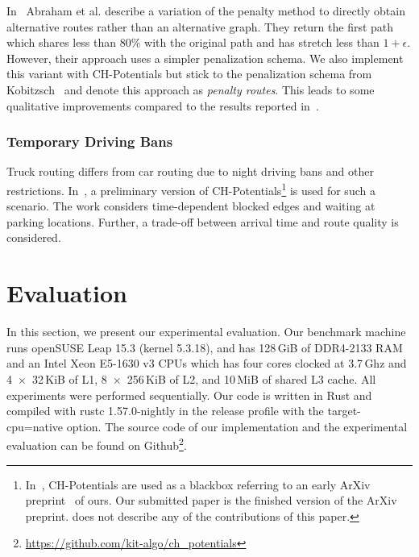 \documentclass[manuscript,review]{acmart}
\begin{document}
In~\cite{adgw-arrn-13} Abraham et al. describe a variation of the penalty method to directly obtain alternative routes rather than an alternative graph.
They return the first path which shares less than 80\% with the original path and has stretch less than $1+\epsilon$.
However, their approach uses a simpler penalization schema.
We also implement this variant with CH-Potentials but stick to the penalization schema from Kobitzsch~\cite{kobitzsch2015alternative} and denote this approach as \emph{penalty routes}.
This leads to some qualitative improvements compared to the results reported in~\cite{adgw-arrn-13}.

\subsubsection{Temporary Driving Bans}

Truck routing differs from car routing due to night driving bans and other restrictions.
In~\cite{kswz-erptd-p-20}, a preliminary version of CH-Potentials\footnote{
In~\cite{kswz-erptd-p-20}, CH-Potentials are used as a blackbox referring to an early ArXiv preprint~\cite{strasser2019perfect} of ours.
Our submitted paper is the finished version of the ArXiv preprint.
\cite{kswz-erptd-p-20} does not describe any of the contributions of this paper.
} is used for such a scenario.
The work considers time-dependent blocked edges and waiting at parking locations.
Further, a trade-off between arrival time and route quality is considered.

\section{Evaluation}

\label{sec:experiments}

\begin{table}
\centering
\caption{Instances used in the evaluation with preprocessing running times to construct a CH or CCH-Potential. With CCH-Potentials $w_{\ell}$ can be updated by rerunning Phase 2 again.}\label{tab:graphs}

\end{table}

In this section, we present our experimental evaluation.
Our benchmark machine runs openSUSE Leap 15.3 (kernel 5.3.18), and has 128\,GiB of DDR4-2133 RAM and an Intel Xeon E5-1630 v3 CPUs which has four cores clocked at 3.7\,Ghz and 4~$\times$~32\,KiB of L1, 8~$\times$~256\,KiB of L2, and 10\,MiB of shared L3 cache.
All experiments were performed sequentially.
Our code is written in Rust and compiled with rustc 1.57.0-nightly in the release profile with the target-cpu=native option.
The source code of our implementation and the experimental evaluation can be found on Github\footnote{\url{https://github.com/kit-algo/ch_potentials}}.
\end{document}
